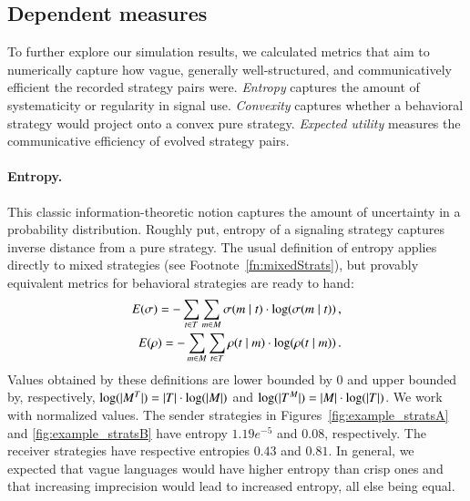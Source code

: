 \documentclass[fleqn,reqno,10pt]{article}
\begin{document}
\subsection{Dependent measures}
 
To further explore our simulation results, we calculated metrics that aim to numerically
capture how vague, generally well-structured, and communicatively efficient the recorded
strategy pairs were. \emph{Entropy} captures the amount of systematicity or regularity in
signal use. \emph{Convexity} captures whether a behavioral strategy would project onto a convex
pure strategy. \emph{Expected utility} measures the communicative efficiency of evolved
strategy pairs.

\paragraph{Entropy.} This classic information-theoretic notion captures the amount of
uncertainty in a probability distribution. Roughly put, entropy of a signaling strategy
captures inverse distance from a pure strategy. The usual definition of entropy applies
directly to mixed strategies (see Footnote~\ref{fn:mixedStrats}), but provably equivalent
metrics for behavioral strategies are ready to hand:
\begin{align*}
  E(\sigma) = -\sum_{t \in T} \sum_{m \in M}
  \sigma(m \mid t) \cdot \log(\sigma(m \mid
  t))\,, \\
  E(\rho) = -\sum_{m \in M} \sum_{t \in T}
  \rho(t \mid m) \cdot \log(\rho(t \mid
  m)) \,. 
\end{align*}
Values obtained by these definitions are lower bounded by $0$ and
upper bounded by, respectively, $\log(|M^T|) = |T|
\cdot \log(|M|)$ and $\log(|T^M|) = |M| \cdot
\log(|T|)$. We work with normalized values. The sender
strategies in Figures~\ref{fig:example_stratsA} and
\ref{fig:example_stratsB} have entropy $1.19e^{-5}$ and $0.08$,
respectively. The receiver strategies have respective entropies $0.43$
and $0.81$. In general, we expected that vague languages would have
higher entropy than crisp ones and that increasing imprecision would
lead to increased entropy, all else being equal.
\end{document}
